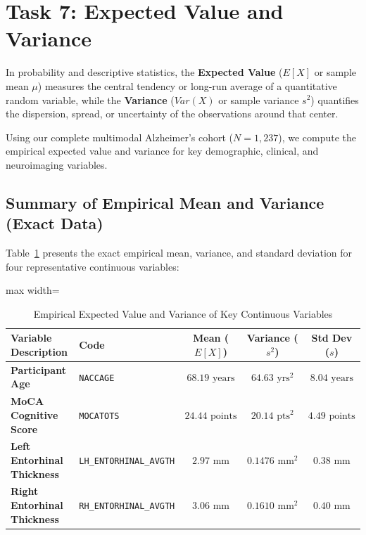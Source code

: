 \documentclass[11pt, a4paper]{article}
\begin{document}
\section{Task 7: Expected Value and Variance}
In probability and descriptive statistics, the \textbf{Expected Value} ($E[X]$ or sample mean $\mu$) measures the central tendency or long-run average of a quantitative random variable, while the \textbf{Variance} ($Var(X)$ or sample variance $s^2$) quantifies the dispersion, spread, or uncertainty of the observations around that center.

Using our complete multimodal Alzheimer's cohort ($N = 1,237$), we compute the empirical expected value and variance for key demographic, clinical, and neuroimaging variables.

\subsection{Summary of Empirical Mean and Variance (Exact Data)}
Table~\ref{tab:task7_ev_var} presents the exact empirical mean, variance, and standard deviation for four representative continuous variables:

\begin{table}[H]
\centering
\caption{Empirical Expected Value and Variance of Key Continuous Variables}
\label{tab:task7_ev_var}
\begin{adjustbox}{max width=\textwidth}
\small
\begin{tabular}{llccc}
\toprule
\textbf{Variable Description} & \textbf{Code} & \textbf{Mean ($E[X]$)} & \textbf{Variance ($s^2$)} & \textbf{Std Dev ($s$)} \\
\midrule
\textbf{Participant Age} & \texttt{NACCAGE} & $68.19\text{ years}$ & $64.63\text{ yrs}^2$ & $8.04\text{ years}$ \\
\textbf{MoCA Cognitive Score} & \texttt{MOCATOTS} & $24.44\text{ points}$ & $20.14\text{ pts}^2$ & $4.49\text{ points}$ \\
\textbf{Left Entorhinal Thickness} & \texttt{LH\_ENTORHINAL\_AVGTH} & $2.97\text{ mm}$ & $0.1476\text{ mm}^2$ & $0.38\text{ mm}$ \\
\textbf{Right Entorhinal Thickness} & \texttt{RH\_ENTORHINAL\_AVGTH} & $3.06\text{ mm}$ & $0.1610\text{ mm}^2$ & $0.40\text{ mm}$ \\
\bottomrule
\end{tabular}
\end{adjustbox}
\end{table}
\end{document}
